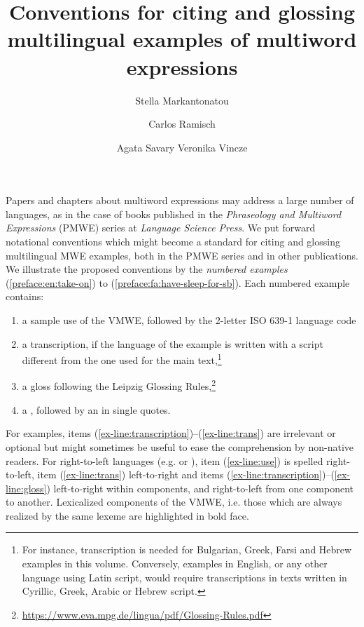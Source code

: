 \documentclass[output=paper
,modfonts,hidelinks
,nonflat]{langsci/langscibook}
\title{Conventions for citing and glossing multilingual examples of multiword expressions}
\author{
 Stella Markantonatou\affiliation{Institute for Language and Speech Processing, Athena RIC, Greece}\and 
 Carlos Ramisch\affiliation{Aix Marseille Univ, Université de Toulon, CNRS, LIS, Marseille, France}\and
 Agata Savary\affiliation{University of Tours, LIFAT, France}\lastand
 Veronika Vincze\affiliation{University of Szeged, Hungary}
}
\begin{document}
\maketitle
{}
Papers and chapters about multiword expressions may address a large number of languages, as in the case of books published in the \textit{Phraseology and Multiword Expressions} (PMWE) series at \textit{Language Science Press}. We put forward notational conventions which might become a standard for citing and glossing multilingual MWE examples, both in the PMWE series and in other publications.
We illustrate the proposed conventions by the \emph{numbered examples}  (\ref{preface:en:take-on}) to (\ref{preface:fa:have-sleep-for-sb}). Each numbered example contains:
\begin{enumerate}%
\item\label{ex-line:use} a sample use of the VMWE, followed by the 2-letter ISO 639-1 language code %

\item\label{ex-line:transcription} a transcription, if the language of the example is written with a script different from the one used for the main text,\footnote{For instance, transcription is needed for Bulgarian, Greek, Farsi and Hebrew examples in this volume. Conversely, examples in English, or any other language using Latin script, would require transcriptions in texts written in Cyrillic, Greek, Arabic or Hebrew script.}

\item\label{ex-line:gloss} a gloss following the Leipzig Glossing Rules,\footnote{\url{https://www.eva.mpg.de/lingua/pdf/Glossing-Rules.pdf}} 

\item\label{ex-line:trans} a , followed by an  in single quotes. 
\end{enumerate}

For  examples, items (\ref{ex-line:transcription})--(\ref{ex-line:trans}) are irrelevant or optional but  might sometimes be useful to ease the comprehension by non-native readers. For right-to-left languages (e.g.  or ), item (\ref{ex-line:use}) is spelled right-to-left, item (\ref{ex-line:trans}) left-to-right and items (\ref{ex-line:transcription})--(\ref{ex-line:gloss}) left-to-right within components, and right-to-left from one component to another. 
Lexicalized components of the VMWE, i.e. those which are always realized by the same lexeme are highlighted in bold face. 
\end{document}
